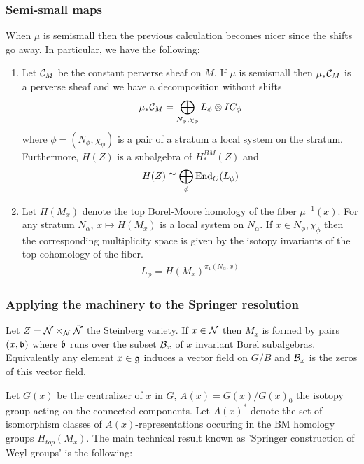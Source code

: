 \documentclass[12pt]{article}
\begin{document}
\subsubsection{Semi-small maps}
When $\mu$ is semismall then the previous calculation becomes nicer
since the shifts go away. In particular, we have the following:
\begin{theorem}
    \begin{enumerate}
        \item Let ${\mathcal{C}}_M$ be the constant perverse sheaf on $M$. If $\mu$ is semismall
              then $\mu_*{\mathcal{C}}_M$ is a perverse sheaf and we have a decomposition without shifts \begin{align*}
                  \mu_*{\mathcal{C}}_M = \bigoplus_{N_\phi,\chi_\phi} L_\phi \otimes IC_\phi
              \end{align*} where $\phi = (N_\phi,\chi_\phi)$ is a pair of a stratum
              a local system on the stratum. Furthermore, $H(Z)$ is a
              subalgebra of $H^{BM}_*(Z)$ and \begin{align*}
                  H(Z) \cong \bigoplus_\phi \operatorname{End}_C(L_\phi)
              \end{align*}
        \item Let $H(M_x)$ denote the top
              Borel-Moore homology of the fiber $\mu^{-1}(x)$. For any
              stratum $N_\alpha$, $x\mapsto H(M_x)$ is a local system on $N_\alpha$.
              If $x\in N_\phi,\chi_\phi$ then the corresponding
                  multiplicity space is given by the isotopy invariants of the
                  top cohomology of the fiber. 
            \begin{align*}
                  L_\phi = H(M_x)^{\pi_1(N_\alpha,x)}
              \end{align*}
    \end{enumerate}
\end{theorem}
\subsubsection{Applying the machinery to the Springer resolution}

Let $Z = \tilde {{\mathcal{N}}}\times_{\mathcal{N}} \tilde {{\mathcal{N}}}$ the Steinberg variety.
If $x\in {\mathcal{N}}$ then $M_x$ is formed by pairs $(x,\mathfrak{b})$ where $\mathfrak{b}$
runs over the subset ${\mathcal{B}}_x$ of $x$ invariant Borel subalgebras. Equivalently
any element $x\in \mathfrak{g}$ induces a vector field on $G/B$ and ${\mathcal{B}}_x$ is the
zeros of this vector field.

Let $G(x)$ be the centralizer of $x$ in $G$, $A(x) = G(x)/G(x)_0$ the isotopy
group acting on the connected components. Let $A(x)^*$ denote the set of isomorphism classes
of $A(x)$-representations occuring in the BM homology groups $H_{top}(M_x)$.
The main technical result known as 'Springer construction of Weyl groups' is the following:
\end{document}

